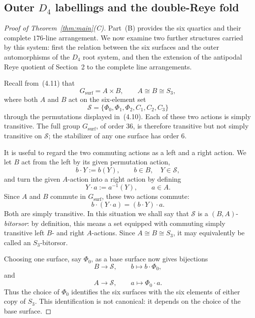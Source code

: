 \documentclass[10pt]{article}
\begin{document}
\subsection{Outer $D_4$ labellings and the double-Reye fold}

\begin{proof}[Proof of Theorem~\ref{thm:main}\textup{(C)}]
Part~\textup{(B)} provides the six quartics and their complete
$176$-line arrangement.  We now examine two further structures carried by
this system: first the relation between the six surfaces and the outer
automorphisms of the $D_4$ root system, and then the extension of the
antipodal Reye quotient of Section~2 to the complete line arrangements.

Recall from~(4.11) that
\[
G_{\mathrm{surf}}=A\times B,
\qquad A\cong B\cong S_3,
\]
where both $A$ and $B$ act on the six-element set
\[
\mathcal S=\{\Phi_0,\Phi_1,\Phi_2,C_1,C_2,C_3\}
\]
through the permutations displayed in~(4.10).  Each of these two actions is
simply transitive.  The full group $G_{\mathrm{surf}}$, of order $36$, is
therefore transitive but not simply transitive on $\mathcal S$; the
stabilizer of any one surface has order $6$.

It is useful to regard the two commuting actions as a left and a right
action.  We let $B$ act from the left by its given permutation action,
\[
b\cdot Y:=b(Y),
\qquad b\in B,\quad Y\in\mathcal S,
\]
and turn the given $A$-action into a right action by defining
\[
Y\cdot a:=a^{-1}(Y),
\qquad a\in A.
\]
Since $A$ and $B$ commute in $G_{\mathrm{surf}}$, these two actions commute:
\[
b\cdot(Y\cdot a)=(b\cdot Y)\cdot a.
\]
Both are simply transitive.  In this situation we shall say that
$\mathcal S$ is a $(B,A)$-\emph{bitorsor}: by definition, this means a set
equipped with commuting simply transitive left $B$- and right $A$-actions.
Since $A\cong B\cong S_3$, it may equivalently be called an
$S_3$-bitorsor.

Choosing one surface, say $\Phi_0$, as a base surface now gives bijections
\[
B\longrightarrow\mathcal S,\qquad b\longmapsto b\cdot\Phi_0,
\]
and
\[
A\longrightarrow\mathcal S,\qquad a\longmapsto\Phi_0\cdot a.
\]
Thus the choice of $\Phi_0$ identifies the six surfaces with the six
elements of either copy of $S_3$.  This identification is not canonical:
it depends on the choice of the base surface.


\end{proof}
\end{document}
